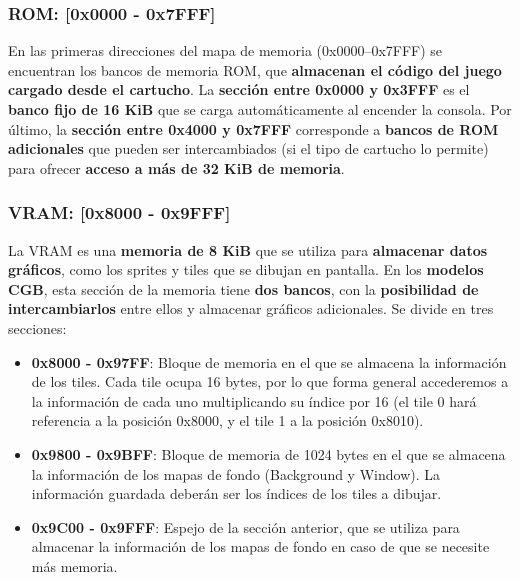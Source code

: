 \subsubsection{ROM: [0x0000 - 0x7FFF]}
En las primeras direcciones del mapa de memoria (0x0000–0x7FFF) se encuentran los bancos de memoria ROM, que \textbf{almacenan el código del juego cargado desde el cartucho}. La \textbf{sección entre 0x0000 y 0x3FFF} es el \textbf{banco fijo de 16 KiB} que se carga automáticamente al encender la consola. Por último, la \textbf{sección entre 0x4000 y 0x7FFF} corresponde a \textbf{bancos de ROM adicionales} que pueden ser intercambiados (si el tipo de cartucho lo permite) para ofrecer \textbf{acceso a más de 32 KiB de memoria}.

\subsubsection{VRAM: [0x8000 - 0x9FFF]}\label{mem:vram}
La VRAM es una \textbf{memoria de 8 KiB} que se utiliza para \textbf{almacenar datos gráficos}, como los sprites y tiles que se dibujan en pantalla. En los \textbf{modelos CGB}, esta sección de la memoria tiene \textbf{dos bancos}, con la \textbf{posibilidad de intercambiarlos} entre ellos y almacenar gráficos adicionales.
\clearpage
Se divide en tres secciones:
\begin{itemize}
    \item \label{mem:vram_1} \textbf{0x8000 - 0x97FF}: Bloque de memoria en el que se almacena la información de los tiles. Cada tile ocupa 16 bytes, por lo que forma general accederemos a la información de cada uno multiplicando su índice por 16 (el tile 0 hará referencia a la posición 0x8000, y el tile 1 a la posición 0x8010).
    \item \textbf{0x9800 - 0x9BFF}: Bloque de memoria de 1024 bytes en el que se almacena la información de los mapas de fondo (Background y Window). La información guardada deberán ser los índices de los tiles a dibujar.
    \item \textbf{0x9C00 - 0x9FFF}: Espejo de la sección anterior, que se utiliza para almacenar la información de los mapas de fondo en caso de que se necesite más memoria.
\end{itemize}

